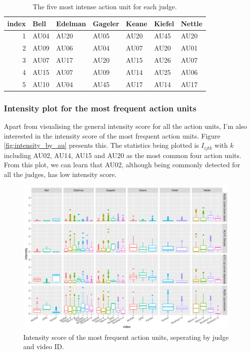 \documentclass{monashthesis}
\begin{document}
\begin{table}

\caption{\label{tab:intensity-table}\label{tab:most_intense}The five most intense action unit for each judge.}
\centering
\begin{tabular}[t]{r|l|l|l|l|l|l}
\hline
index & Bell & Edelman & Gageler & Keane & Kiefel & Nettle\\
\hline
1 & AU04 & AU20 & AU05 & AU20 & AU45 & AU20\\
\hline
2 & AU09 & AU06 & AU04 & AU07 & AU20 & AU01\\
\hline
3 & AU07 & AU17 & AU20 & AU15 & AU26 & AU07\\
\hline
4 & AU15 & AU07 & AU09 & AU14 & AU25 & AU06\\
\hline
5 & AU10 & AU04 & AU45 & AU17 & AU14 & AU17\\
\hline
\end{tabular}
\end{table}

\hypertarget{intensity-plot-for-the-most-frequent-action-units}{%
\subsubsection{Intensity plot for the most frequent action units}\label{intensity-plot-for-the-most-frequent-action-units}}

Apart from visualising the general intensity score for all the action units, I'm also interested in the intensity score of the most frequent action units. Figure \ref{fig:intensity_by_au} presents this. The statistics being plotted is \(I_{ijtk}\) with \(k\) including AU02, AU14, AU15 and AU20 as the most common four action units. From this plot, we can learn that AU02, although being commonly detected for all the judges, has low intensity score.

\begin{figure}

{\centering \includegraphics[width=1\linewidth]{figures/intensity-most-frequent-1} 

}

\caption{Intensity score of the most frequent action units, seperating by judge and video ID.\label{fig:intensity_by_au}}\label{fig:intensity-most-frequent}
\end{figure}
\end{document}

